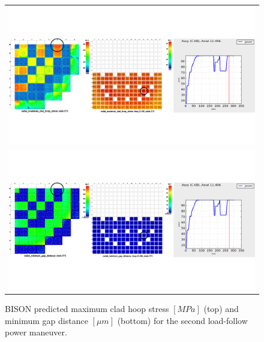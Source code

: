 \documentclass[edeposit,fullpage,11pt]{uiucthesis2009}
\begin{document}
\begin{landscape}
\begin{figure}[h]
\begin{tabular}{c}
\includegraphics[trim={0 4cm 0 4cm},clip,width=\linewidth]{./Figures/bison_res/PR2_MCHS.pdf} \\
\includegraphics[trim={0 4cm 0 4cm},clip,width=\linewidth]{./Figures/bison_res/PR2_MGD.pdf} \\
\end{tabular}
\caption{BISON predicted maximum clad hoop stress $[MPa]$ (top) and minimum gap distance $[ \mu m]$ (bottom) for the second load-follow power maneuver.}
\label{fig:bison_PR2}
\end{figure}
\end{landscape}
\end{document}
